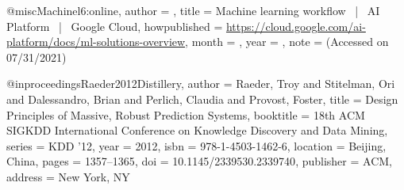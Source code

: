 
@misc{Machinel6:online,
author = {},
title = {Machine learning workflow  |  AI Platform  |  Google Cloud},
howpublished = {\url{https://cloud.google.com/ai-platform/docs/ml-solutions-overview}},
month = {},
year = {},
note = {(Accessed on 07/31/2021)}
}






@inproceedings{Raeder2012Distillery,
 author = {Raeder, Troy and Stitelman, Ori and Dalessandro, Brian and Perlich, Claudia and Provost, Foster},
 title = {Design Principles of Massive, Robust Prediction Systems},
 booktitle = {18th ACM SIGKDD International Conference on Knowledge Discovery and Data Mining},
 series = {KDD '12},
 year = {2012},
 isbn = {978-1-4503-1462-6},
 location = {Beijing, China},
 pages = {1357--1365},
 doi = {10.1145/2339530.2339740},
 publisher = {ACM},
 address = {New York, NY}
} 

